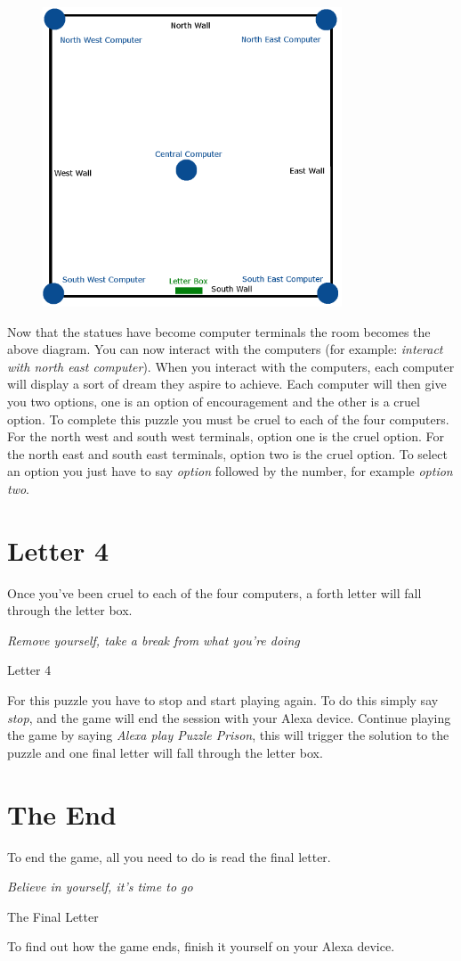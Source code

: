 \documentclass{article}
\begin{document}
\begin{figure}[htb]
	\centering
	\includegraphics[width=3.5in]{RoomLayout3.png}
\end{figure}

Now that the statues have become computer terminals the room becomes the above diagram. You can now interact with the computers (for example: \textit{interact with north east computer}).
When you interact with the computers, each computer will display a sort of dream they aspire to achieve.
Each computer will then give you two options, one is an option of encouragement and the other is a cruel option.
To complete this puzzle you must be cruel to each of the four computers.
For the north west and south west terminals, option one is the cruel option.
For the north east and south east terminals, option two is the cruel option.
To select an option you just have to say \textit{option} followed by the number, for example \textit{option two}.

\newpage
\section*{Letter 4}
Once you've been cruel to each of the four computers, a forth letter will fall through the letter box.

\epigraph{\textit{Remove yourself, take a break from what you're doing}}{Letter 4}

For this puzzle you have to stop and start playing again.
To do this simply say \textit{stop}, and the game will end the session with your Alexa device.
Continue playing the game by saying \textit{Alexa play Puzzle Prison}, this will trigger the solution to the puzzle and one final letter will fall through the letter box.

\section*{The End}

To end the game, all you need to do is read the final letter.

\epigraph{\textit{Believe in yourself, it's time to go}}{The Final Letter}

To find out how the game ends, finish it yourself on your Alexa device.
\end{document}
